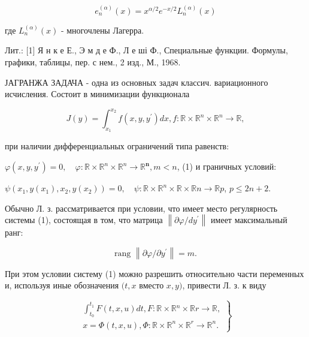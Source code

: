 \documentclass[10pt]{article}
\begin{document}
\[

e_{n}^{(\alpha)}(x)=x^{\alpha / 2} e^{-x / 2} L_{n}^{(\alpha)}(x)

\]



где $L_{n}^{(\alpha)}(x)$ - многочлены Лагерра.



Лит.: [1] Я н к е Е., Э м д е Ф., Л е ші Ф., Специальные функции. Формулы, графики, таблицы, пер. с нем., 2 изд., М., 1968.



ЈАГРАНЖА ЗАДАЧА - одна из основных задач классич. вариационного исчисления. Состоит в минимизации функционала



\[

J(y)=\int_{x_{1}}^{x_{2}} f\left(x, y, y^{\prime}\right) d x, f: \mathbb{R} \times \mathbb{R}^{n} \times \mathbb{R}^{n} \longrightarrow \mathbb{R},

\]



при наличии дифференциальных ограничений типа равенств:



$\varphi\left(x, y, y^{\prime}\right)=0, \quad \varphi: \mathbb{R} \times \mathbb{R}^{n} \times \mathbb{R}^{n} \longrightarrow \mathbb{R}^{\boldsymbol{n}}, m<n$, (1) и граничных условий:



$\psi\left(x_{1}, y\left(x_{1}\right), x_{2}, y\left(x_{2}\right)\right)=0, \quad \psi: \mathbb{R} \times \mathbb{R}^{n} \times \mathbb{R} \times \mathbb{R} n \rightarrow \mathbb{R} p$, $p \leqslant 2 n+2$.



Обычно Л. з. рассматривается при условии, что имеет место регулярность системы (1), состоящая в том, что матрица $\left\|\partial \varphi / d y^{\prime}\right\|$ имеет максимальный ранг:



\[

\text { rang }\left\|\partial \varphi / \partial y^{\prime}\right\|=m \text {. }

\]



При этом условии систему (1) можно разрешить относительно части переменных и, используя иные обозначения $(t, x$ вместо $x, y)$, привести Л. з. к виду



\[

\left.\begin{array}{l}

\int_{t_{0}}^{t_{1}} F(t, x, u) d t, F: \mathbb{R} \times \mathbb{R}{ }^{n} \times \mathbb{R} r \longrightarrow \mathbb{R}, \\

x=\Phi(t, x, u), \Phi: \mathbb{R} \times \mathbb{R}^{n} \times \mathbb{R}^{r} \longrightarrow \mathbb{R}^{n} .

\end{array}\right\}

\]
\end{document}
